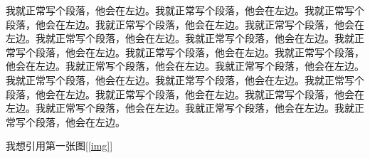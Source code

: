 \documentclass[a4paper,11pt]{article}
\begin{document}
我就正常写个段落，他会在左边。我就正常写个段落，他会在左边。我就正常写个段落，他会在左边。我就正常写个段落，他会在左边。我就正常写个段落，他会在左边。我就正常写个段落，他会在左边。我就正常写个段落，他会在左边。我就正常写个段落，他会在左边。我就正常写个段落，他会在左边。我就正常写个段落，他会在左边。我就正常写个段落，他会在左边。我就正常写个段落，他会在左边。我就正常写个段落，他会在左边。我就正常写个段落，他会在左边。我就正常写个段落，他会在左边。我就正常写个段落，他会在左边。我就正常写个段落，他会在左边。我就正常写个段落，他会在左边。我就正常写个段落，他会在左边。我就正常写个段落，他会在左边。

\par{} 我想引用第一张图[\ref{img}]


\end{document}

